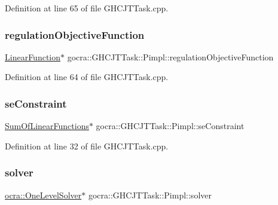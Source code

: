 Definition at line 65 of file G\+H\+C\+J\+T\+Task.\+cpp.

\hypertarget{structgocra_1_1GHCJTTask_1_1Pimpl_a74195cf444c7ab8673985cf9cd7de28d}{}\label{structgocra_1_1GHCJTTask_1_1Pimpl_a74195cf444c7ab8673985cf9cd7de28d} 
\subsubsection{\texorpdfstring{regulation\+Objective\+Function}{regulationObjectiveFunction}}
{\footnotesize\ttfamily \hyperlink{classocra_1_1LinearFunction}{Linear\+Function}$\ast$ gocra\+::\+G\+H\+C\+J\+T\+Task\+::\+Pimpl\+::regulation\+Objective\+Function}



Definition at line 64 of file G\+H\+C\+J\+T\+Task.\+cpp.

\hypertarget{structgocra_1_1GHCJTTask_1_1Pimpl_ab0953e75c824e2aa63477976b94a1806}{}\label{structgocra_1_1GHCJTTask_1_1Pimpl_ab0953e75c824e2aa63477976b94a1806} 
\subsubsection{\texorpdfstring{se\+Constraint}{seConstraint}}
{\footnotesize\ttfamily \hyperlink{classocra_1_1SumOfLinearFunctions}{Sum\+Of\+Linear\+Functions}$\ast$ gocra\+::\+G\+H\+C\+J\+T\+Task\+::\+Pimpl\+::se\+Constraint}



Definition at line 32 of file G\+H\+C\+J\+T\+Task.\+cpp.

\hypertarget{structgocra_1_1GHCJTTask_1_1Pimpl_ac9f3b5650e8663982f631c354a25e3b9}{}\label{structgocra_1_1GHCJTTask_1_1Pimpl_ac9f3b5650e8663982f631c354a25e3b9} 
\subsubsection{\texorpdfstring{solver}{solver}}
{\footnotesize\ttfamily \hyperlink{classocra_1_1OneLevelSolver}{ocra\+::\+One\+Level\+Solver}$\ast$ gocra\+::\+G\+H\+C\+J\+T\+Task\+::\+Pimpl\+::solver}



